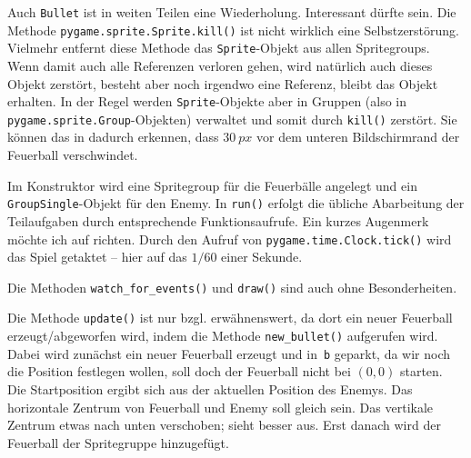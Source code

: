 Auch \texttt{Bullet} ist in weiten Teilen eine Wiederholung. Interessant dürfte  sein. Die Methode \texttt{pygame.sprite.Sprite.kill()} ist nicht wirklich eine Selbstzerstörung. Vielmehr entfernt diese Methode das \texttt{Sprite}-Objekt aus allen Spritegroups. Wenn damit auch alle Referenzen verloren gehen, wird natürlich auch dieses Objekt zerstört, besteht aber noch irgendwo eine Referenz, bleibt das Objekt erhalten. In der Regel werden \texttt{Sprite}-Objekte aber in Gruppen (also in \texttt{pygame.sprite.Group}-Objekten) verwaltet und somit durch \texttt{kill()} zerstört. Sie können das in  dadurch erkennen, dass $30~px$ vor dem unteren Bildschirmrand der Feuerball verschwindet.


Im Konstruktor wird eine Spritegroup für die Feuerbälle angelegt und ein \texttt{GroupSingle}-Objekt für den Enemy. In \texttt{run()} erfolgt die übliche Abarbeitung der Teilaufgaben durch entsprechende Funktionsaufrufe. Ein kurzes Augenmerk möchte ich auf  richten. Durch den Aufruf von \texttt{pygame.time.Clock.tick()} wird das Spiel getaktet -- hier auf das $1/60$ einer Sekunde. 


Die Methoden \texttt{watch\_for\_events()} und \texttt{draw()} sind auch ohne Besonderheiten.


Die Methode \texttt{update()} ist nur bzgl.  erwähnenswert, da dort ein neuer Feuerball erzeugt/abgeworfen wird, indem die Methode \texttt{new\_bullet()} aufgerufen wird. Dabei wird zunächst ein neuer Feuerball erzeugt und in~\texttt{b} geparkt, da wir noch die Position festlegen wollen, soll doch der Feuerball nicht bei $(0,0)$ starten. Die Startposition ergibt sich aus der aktuellen Position des Enemys. Das horizontale Zentrum von Feuerball und Enemy soll gleich sein. Das vertikale Zentrum etwas nach unten verschoben; sieht besser aus. Erst danach wird der Feuerball der Spritegruppe hinzugefügt.

